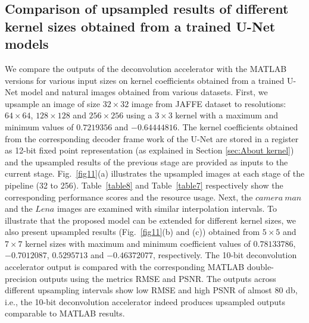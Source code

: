 \documentclass[journal]{IEEEtran}
\begin{document}
\subsection{Comparison of upsampled results of different kernel sizes obtained from a trained U-Net models}
\label{sec:Upsampled results from}
We compare the outputs of the deconvolution accelerator with the MATLAB versions for various input sizes on kernel coefficients obtained from a trained U-Net model and natural images obtained from various datasets. First, we upsample an image of size $32\times32$ image from JAFFE dataset \cite{website1} to resolutions: $64 \times 64$, $128 \times 128$ and $256\times 256$ using a $3\times3$ kernel with a maximum and minimum values of $0.7219356$ and $-0.64444816$. The kernel coefficients obtained from the corresponding decoder frame work of the U-Net are stored in a register as 12-bit fixed point representation (as explained in Section \ref{sec:About kernel}) and the upsampled results of the previous stage are provided as inputs to the current stage. Fig.~\ref{fig11}(a) illustrates the upsampled images at each stage of the pipeline (32 to 256). Table~\ref{table8} and Table~\ref{table7} respectively show the corresponding performance scores and the resource usage. Next, the $camera\ man$ and the $Lena$ images are examined with similar interpolation intervals. To illustrate that the proposed model can be extended for different kernel sizes, we also present upsampled results (Fig.~\ref{fig11}(b) and (c)) obtained from $5\times 5$ and $7\times 7$ kernel sizes with maximum and minimum coefficient values of $0.78133786$, $-0.7012087$, $0.5295713$ and $-0.46372077$, respectively. The 10-bit deconvolution accelerator output is compared with the corresponding MATLAB double-precision outputs using the metrics RMSE and PSNR. The outputs across different upsampling intervals show low RMSE and high PSNR of almost 80 db, i.e., the 10-bit deconvolution accelerator indeed produces upsampled outputs comparable to MATLAB results. 


\begin{table}[h]
	\caption{Resource usage for upsampling $32 \times 32$ to $256 \times 256$ using a $3\times3$ kernel.}
	\label{table7}
\end{table}
\end{document}

